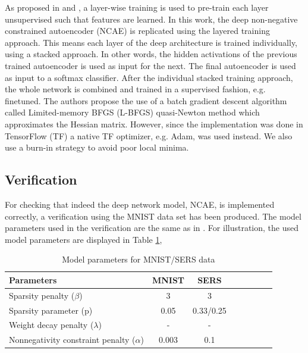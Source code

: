 \documentclass{article}
\begin{document}
As proposed in \cite{Hosseini-Asl2016} and \cite{Vincent}, a layer-wise training is used to pre-train each layer unsupervised such that features are learned. In this work, the deep non-negative constrained autoencoder (NCAE) is replicated using the layered training approach. This means each layer of the deep architecture is trained individually, using a stacked approach. In other words, the hidden activations of the previous trained autoencoder is used as input for the next. The final autoencoder is used as input to a softmax classifier. After the individual stacked training approach, the whole network is combined and trained in a supervised fashion, e.g. finetuned. The authors propose the use of a batch gradient descent algorithm called Limited-memory BFGS (L-BFGS) quasi-Newton method which approximates the Hessian matrix. However, since the implementation was done in TensorFlow (TF) a native TF optimizer, e.g. Adam, was used instead. We also use a burn-in strategy to avoid poor local minima. 

\subsection{Verification}

For checking that indeed the deep network model, NCAE, is implemented correctly, a verification using the MNIST data set has been produced. The model parameters used in the verification are the same as in \cite{Hosseini-Asl2016}. For illustration, the used model parameters are displayed in Table \ref{tab:parameters},

\begin{table}[h]
	\centering
\begin{tabular}{l*{6}{c}r}
	\hline
	Parameters             & MNIST & SERS \\
	\hline
	Sparsity penalty ($\beta$) & 3 & 3\\
	\hline
	Sparsity parameter (p)            & 0.05 & 0.33/0.25  \\
	\hline
	Weight decay penalty ($\lambda$)           & - & - \\
	\hline
	Nonnegativity constraint penalty ($\alpha$)     & 0.003 & 0.1\\
	\hline
\end{tabular}
   \caption{Model parameters for MNIST/SERS data}
\label{tab:parameters} 
\end{table}
\end{document}
